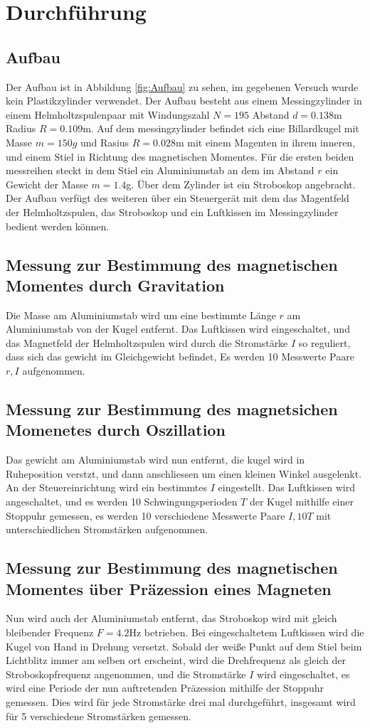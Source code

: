 \section{Durchführung}
\label{sec:Durchführung}
\subsection{Aufbau}
Der Aufbau ist in Abbildung \ref{fig:Aufbau} zu sehen, im gegebenen Versuch wurde kein Plastikzylinder verwendet.
Der Aufbau besteht aus einem Messingzylinder in einem Helmholtzspulenpaar mit Windungszahl $N = 195$ Abstand $d = 0.138$m Radius $R = 0.109$m. Auf dem messingzylinder befindet sich eine Billardkugel mit Masse $m = 150g$ und Rasius $R = 0.028$m mit einem Magenten in ihrem inneren, und einem Stiel in Richtung des magnetischen Momentes.
Für die ersten beiden messreihen steckt in dem Stiel ein Aluminiumstab an dem im Abstand $r$ ein Gewicht der Masse $m = 1.4$g. Über dem Zylinder ist ein Stroboskop angebracht. Der Aufbau verfügt des weiteren über ein Steuergerät mit dem das Magentfeld der Helmholtzspulen, 
das Stroboskop und ein Luftkissen im Messingzylinder bedient werden können.
\subsection{Messung zur Bestimmung des magnetischen Momentes durch Gravitation}
Die Masse am Aluminiumstab wird um eine bestimmte Länge $r$ am Aluminiumstab von der Kugel entfernt. Das Luftkissen wird eingeschaltet, und das Magnetfeld der Helmholtzspulen wird durch die Stromstärke $I$ so reguliert,
dass sich das gewicht im Gleichgewicht befindet, Es werden 10 Messwerte Paare $r,I$ aufgenommen.
\subsection{Messung zur Bestimmung des magnetsichen Momenetes durch Oszillation}
Das gewicht am Aluminiumstab wird nun entfernt, die kugel wird in Ruheposition verstzt, und dann anschliessen um einen kleinen Winkel ausgelenkt. An der Steuereinrichtung wird ein bestimmtes $I$ eingestellt. Das Luftkissen wird angeschaltet, und es werden 10 Schwingungsperioden $T$ der Kugel mithilfe einer Stoppuhr gemessen, es werden 10 verschiedene Messwerte Paare $I,10T$
mit unterschiedlichen Stromstärken aufgenommen.
\subsection{Messung zur Bestimmung des magnetischen Momentes über Präzession eines Magneten}
Nun wird auch der Aluminiumstab entfernt, das Stroboskop wird mit gleich bleibender Frequenz $F = 4.2$Hz betrieben. Bei eingeschaltetem Luftkissen wird die Kugel
 von Hand in Drehung versetzt. Sobald der weiße Punkt auf dem Stiel beim Lichtblitz immer am selben ort erscheint, wird die Drehfrequenz als gleich der Stroboskopfrequenz angenommen, und die Stromstärke $I$ wird eingeschaltet, es wird eine Periode der nun auftretenden Präzession mithilfe der Stoppuhr gemessen. 
 Dies wird für jede Stromstärke drei mal durchgeführt, insgesamt wird für 5 verschiedene Stromstärken gemessen.

